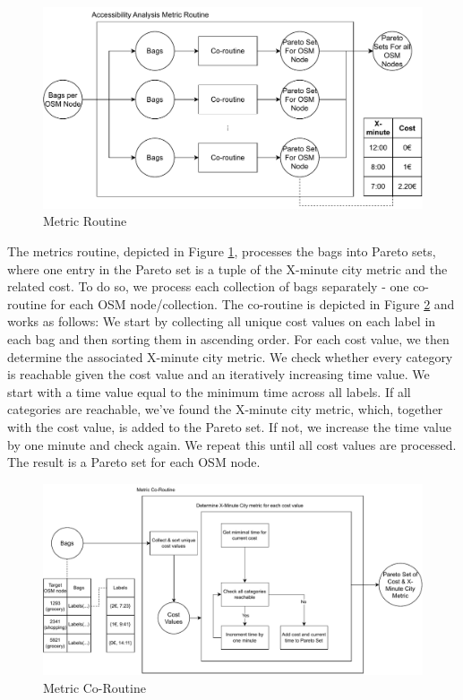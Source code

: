 \begin{figure}
    \centering
    \includegraphics[scale=0.50]{Figures/method/metric_routine}
    \caption{Metric Routine}
    \label{fig:metric_routine}
\end{figure}
The metrics routine, depicted in Figure \ref{fig:metric_routine}, processes the bags into Pareto sets, where one entry in the Pareto set is a tuple of the X-minute city metric and the related cost.
To do so, we process each collection of bags separately - one co-routine for each OSM node/collection.
The co-routine is depicted in Figure \ref{fig:metric_co_routine} and works as follows:
We start by collecting all unique cost values on each label in each bag and then sorting them in ascending order.
For each cost value, we then determine the associated X-minute city metric.
We check whether every category is reachable given the cost value and an iteratively increasing time value.
We start with a time value equal to the minimum time across all labels.
If all categories are reachable, we've found the X-minute city metric, which, together with the cost value, is added to the Pareto set.
If not, we increase the time value by one minute and check again.
We repeat this until all cost values are processed.
The result is a Pareto set for each OSM node.

\begin{figure}
    \centering
    \includegraphics[scale=0.60]{Figures/method/metric_coroutine}
    \caption{Metric Co-Routine}
    \label{fig:metric_co_routine}
\end{figure}
